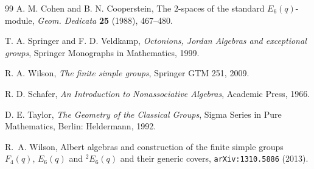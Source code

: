 \documentclass{amsart}
\theoremstyle{plain}
\numberwithin{theorem}{section}
\theoremstyle{definition}
\begin{document}
\begin{thebibliography}{99}
 A. M. Cohen and B. N. Cooperstein,
The $2$-spaces of the standard $E_6(q)$-module,
{\it Geom. Dedicata} {\bf 25} (1988), 467--480.

 T. A. Springer and F. D. Veldkamp,
{\em Octonions, Jordan Algebras and exceptional groups},
Springer Monographs in Mathematics, 1999.

 R. A. Wilson,
{\it The finite simple groups}, Springer GTM 251, 2009.

 R. D. Schafer, {\it 	An Introduction to Nonassociative Algebras},
Academic Press, 1966.

 D. E. Taylor, {\it The Geometry of the Classical Groups},
Sigma Series in Pure Mathematics, Berlin: Heldermann, 1992.

 R.~A. Wilson, Albert algebras and construction of
the finite simple groups $F_4(q)$, $E_6(q)$ and ${}^2E_6(q)$ and their
generic covers, \texttt{arXiv:1310.5886} (2013).

\end{thebibliography}
\end{document}
